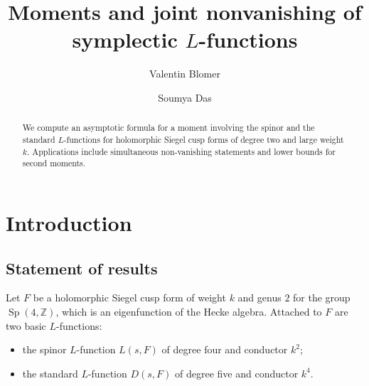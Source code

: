 \documentclass[11pt]{amsart}
\numberwithin{equation}{section}
\theoremstyle{plain}
\theoremstyle{definition}
\newcommand{\Z}{\mathbb{Z}}
\newcommand{\Sp}{\operatorname{Sp}}
\numberwithin{equation}{section}
\begin{document}
\author{Valentin Blomer}
\address{Mathematisches Institut, Endenicher Allee 60, 53115 Bonn, Germany}
 
\author{Soumya Das}
\address{Department of Mathematics, Indian Institute of Science, Bangalore - 560012, India}


 \title{Moments and joint nonvanishing of symplectic $L$-functions}



\begin{abstract} We compute an asymptotic formula for a moment involving the spinor and the standard $L$-functions for holomorphic Siegel cusp forms of degree two and large weight $k$. Applications include simultaneous non-vanishing statements and lower bounds for second moments. 
\end{abstract}


\setcounter{tocdepth}{2}  \maketitle 

\maketitle


\section{Introduction}
 
 \subsection{Statement of results}
 Let $F$ be a holomorphic Siegel cusp form of weight $k$ and genus $2$ for the group $ \Sp(4,\Z) $, which is an eigenfunction of the Hecke algebra.  Attached to $F$ are two basic $L$-functions:
 \begin{itemize}
 \item the spinor $L$-function $L(s, F)$ of degree four and conductor $k^2$;
 \item the standard $L$-function $D(s,F)$ of degree five and conductor $k^4$.
 \end{itemize}
 
\end{document}
